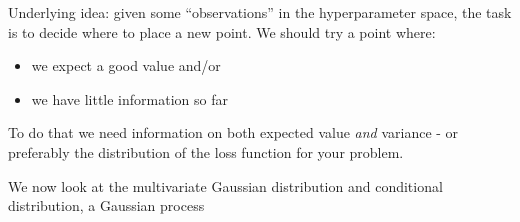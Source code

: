 \documentclass[
  ignorenonframetext,
]{beamer}
\providecommand{\tightlist}{%
  \setlength{\itemsep}{0pt}\setlength{\parskip}{0pt}}
\begin{document}
\begin{frame}

Underlying idea: given some ``observations'' in the hyperparameter
space, the task is to decide where to place a new point. We should try a
point where:

\begin{itemize}
\tightlist
\item
  we expect a good value and/or
\item
  we have little information so far
\end{itemize}

To do that we need information on both expected value \emph{and}
variance - or preferably the distribution of the loss function for your
problem.

We now look at the multivariate Gaussian distribution and conditional
distribution, a Gaussian process

\end{frame}
\end{document}
